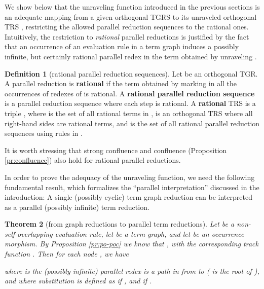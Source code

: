 \documentclass{eptcs}
\theoremstyle{plain}
\newtheorem{theorem}{Theorem} \newtheorem{lemma}[theorem]{Lemma}
\theoremstyle{definition}
\newtheorem{definition}[theorem]{Definition}
\begin{document}
We show below that the unraveling function  introduced in 
the previous sections is an adequate mapping from a given orthogonal 
TGRS 
 to its unraveled orthogonal TRS , 
restricting the allowed parallel reduction sequences to the rational 
ones. Intuitively, the restriction to \emph{rational} parallel reductions is
justified by the fact that an occurrence of an evaluation rule  in a
term graph  induces a possibly infinite, but certainly
rational parallel redex in the term obtained by unraveling .  


\begin{definition} 
[rational parallel reduction sequences]
\label{de:rational sequences}
Let  be an orthogonal TGR. A parallel reduction  is {\bf rational} if the term obtained by marking 
in  all the occurrences of redexes of  is rational. A {\bf 
rational parallel reduction sequence} is a   parallel reduction 
sequence where each step is rational. A {\bf rational} TRS is a triple
, where 
 is 
the set of all rational terms in ,  is an 
orthogonal TRS where all right-hand sides are rational terms, and 
 is the set of all rational parallel 
reduction sequences 
using rules in .
\end{definition}


It is worth stressing that strong confluence and confluence 
(Proposition \ref{pr:confluence}) also hold for rational parallel 
reductions. 

In order to prove the adequacy of the unraveling function, we need 
the following fundamental result, which formalizes the ``parallel
interpretation'' discussed in the introduction: 
A single (possibly cyclic) term graph 
reduction can be interpreted as a parallel (possibly infinite) term 
reduction.

\begin{theorem} 
[from graph reductions to parallel term reductions]
\label{th:soundness}
Let  be a 
non-self-overlapping evaluation rule, let  be a term graph, and let 
 be an occurrence morphism. By Proposition \ref{pr:po-poc}
we know that , with the corresponding track 
function . Then for each node , we 
have 

\noindent
where  is the (possibly infinite) parallel redex  is a path in  
from  to   ( is the root of 
), and where substitution  is defined as  if , and  if .
\end{theorem}
\end{document}
